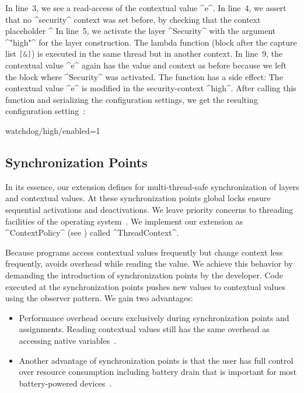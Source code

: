 In line~3, we see a read-access of the contextual value ^e^.
In line~4, we assert that no ^security^ context was set before, by checking that the context placeholder ^%
In line~5, we activate the layer ^Security^ with the argument ^"high"^ for the layer construction.
The lambda function (block after the capture list \lstinline[language=Cpp]^[&]^) is executed in the same thread but in another context.
In line~9, the contextual value ^e^ again has the value and context as before because we left the block where ^Security^ was activated.
The function has a side effect:
The contextual value ^e^ is modified in the security-context ^high^.
After calling this function and serializing the configuration settings, we get the resulting configuration setting~\cite{raab2015global}:

\begin{code}[language=CfgElektra]
watchdog/high/enabled=1
\end{code}

\subsection{Synchronization Points}


In its essence, our extension defines  for multi-thread-safe synchronization of layers and contextual values.
At these synchronization points global locks ensure sequential activations and deactivations.
We leave priority concerns to threading facilities of the operating system~\cite{raab2015global}.
We implement our extension as ^ContextPolicy^ (see ) called ^ThreadContext^.

Because programs access contextual values frequently but change context less frequently, \elektra{} avoids overhead while reading the value.
We achieve this behavior by demanding the introduction of synchronization points by the developer.
Code executed at the synchronization points pushes new values to contextual values using the observer pattern.
We gain two advantages:
\begin{itemize}
\item
Performance overhead occurs exclusively during synchronization points and assignments.
Reading contextual values still has the same overhead as accessing native variables~\cite{raab2014program}.
\item
Another advantage of synchronization points is that the user has full control over resource consumption including battery drain that is important for most battery-powered devices~\cite{raab2016persistent}.
\end{itemize}

